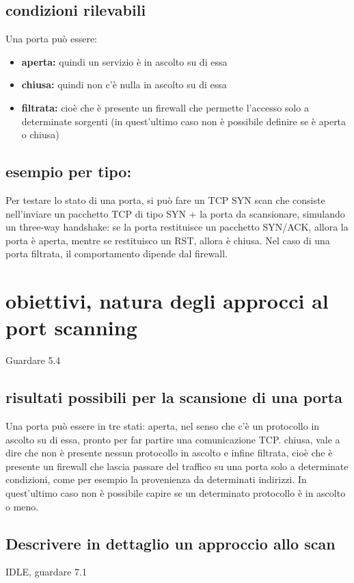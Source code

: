 \documentclass{report}
\begin{document}
\subsection{condizioni rilevabili}
Una porta può essere:
\begin{itemize}
    \item \textbf{aperta:} quindi un servizio è in ascolto su di essa
    \item \textbf{chiusa:} quindi non c'è nulla in ascolto su di essa 
    \item \textbf{filtrata:} cioè che è presente un firewall che permette l'accesso solo a determinate sorgenti (in quest'ultimo caso non è possibile definire se è aperta o chiusa)
\end{itemize} 

\subsection{esempio per tipo:}
Per testare lo stato di una porta, si può fare un TCP SYN scan che consiste nell'inviare un pacchetto TCP di tipo SYN + la porta da scansionare,
simulando un three-way handshake: se la porta restituisce un pacchetto SYN/ACK, 
allora la porta è aperta, mentre se restituisco un RST, allora è chiusa. Nel caso di una porta filtrata, il comportamento dipende dal firewall.


\section{obiettivi, natura degli approcci al port scanning}
Guardare 5.4
\subsection{risultati possibili per la scansione di una porta}
Una porta può essere in tre stati: aperta, nel senso che c'è un protocollo in ascolto su di essa, pronto per far partire una comunicazione TCP.
chiusa, vale a dire che non è presente nessun protocollo in ascolto e infine filtrata, cioè che è presente un firewall che lascia passare del traffico
su una porta solo a determinate condizioni, come per esempio la provenienza da determinati indirizzi.
In quest'ultimo caso non è possibile capire se un determinato protocollo è in ascolto o meno.

\subsection{Descrivere in dettaglio un approccio allo scan}
IDLE, guardare 7.1
\end{document}
